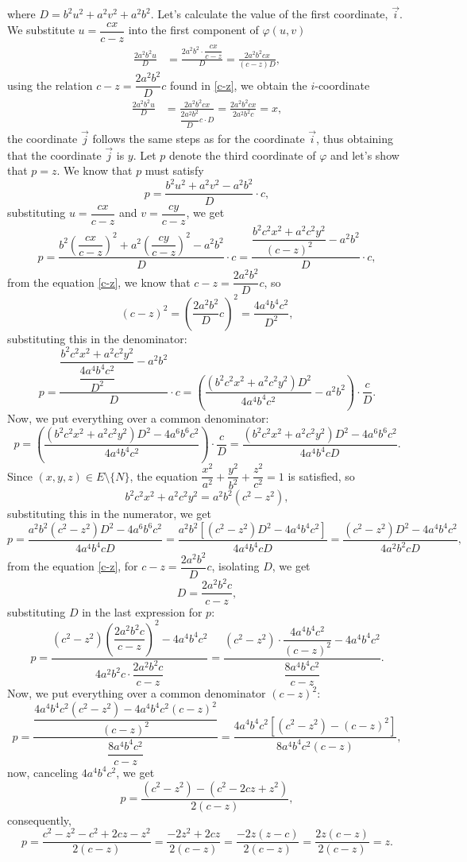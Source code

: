 \documentclass{amsart}
\theoremstyle{plain}
\numberwithin{equation}{section}
\begin{document}
where \( D = b^2u^2 + a^2v^2 + a^2b^2 \). Let's calculate the value of the first coordinate, \( \vec{i} \). We substitute \( u = \dfrac{cx}{c - z} \) into the first component of \( \varphi(u,v) \)
\begin{align*}
	\frac{2a^2b^2u}{D} &= \frac{2a^2b^2 \cdot \dfrac{cx}{c - z}}{D} = \frac{2a^2b^2cx}{(c - z)D},
\end{align*}
using the relation \( c - z = \dfrac{2a^2b^2}{D}c \) found in \eqref{c-z}, we obtain the \( i \)-coordinate
\begin{align*}
	\frac{2a^2b^2u}{D} &= \frac{2a^2b^2cx}{\dfrac{2a^2b^2}{D}c \cdot D} = \frac{2a^2b^2cx}{2a^2b^2c} = x,
\end{align*}
the coordinate \( \vec{j} \) follows the same steps as for the coordinate \( \vec{i} \), thus obtaining that the coordinate \( \vec{j} \) is \( y \). Let \( p \) denote the third coordinate of \( \varphi \) and let's show that \( p = z \). We know that \( p \) must satisfy
$$
p = \frac{b^2u^2 + a^2v^2 - a^2b^2}{D} \cdot c,
$$
substituting \( u = \dfrac{cx}{c - z} \) and \( v = \dfrac{cy}{c - z} \), we get
$$
p = \frac{b^2\left( \dfrac{cx}{c-z} \right)^2 + a^2\left( \dfrac{cy}{c-z} \right)^2 - a^2b^2 }{D} \cdot c
= \frac{ \dfrac{b^2c^2x^2 + a^2c^2y^2}{(c-z)^2} - a^2b^2 }{D} \cdot c,
$$
from the equation \eqref{c-z}, we know that \( c - z = \dfrac{2a^2b^2}{D}c \), so
$$
(c - z)^2 = \left( \dfrac{2a^2b^2}{D}c \right)^2 = \dfrac{4a^4b^4c^2}{D^2},
$$
substituting this in the denominator:
$$
p = \frac{ \dfrac{b^2c^2x^2 + a^2c^2y^2}{\dfrac{4a^4b^4c^2}{D^2}} - a^2b^2 }{D} \cdot c
=\left( \dfrac{(b^2c^2x^2 + a^2c^2y^2)D^2}{4a^4b^4c^2} - a^2b^2 \right) \cdot \dfrac{c}{D}.
$$
Now, we put everything over a common denominator:
$$
p = \left( \dfrac{(b^2c^2x^2 + a^2c^2y^2)D^2 - 4a^6b^6c^2}{4a^4b^4c^2} \right) \cdot \dfrac{c}{D}
= \dfrac{(b^2c^2x^2 + a^2c^2y^2)D^2 - 4a^6b^6c^2}{4a^4b^4c D}.
$$
Since \( (x,y,z) \in E \setminus \{N\} \), the equation \( \dfrac{x^2}{a^2} + \dfrac{y^2}{b^2} + \dfrac{z^2}{c^2} = 1 \) is satisfied, so
$$
b^2c^2x^2 + a^2c^2y^2 = a^2b^2(c^2 - z^2),
$$
substituting this in the numerator, we get
$$
p = \dfrac{a^2b^2(c^2 - z^2)D^2 - 4a^6b^6c^2}{4a^4b^4c D}
= \dfrac{a^2b^2 \left[ (c^2 - z^2)D^2 - 4a^4b^4c^2 \right]}{4a^4b^4c D}= \dfrac{(c^2 - z^2)D^2 - 4a^4b^4c^2}{4a^2b^2c D},
$$
from the equation \eqref{c-z}, for \( c - z = \dfrac{2a^2b^2}{D}c \), isolating \( D \), we get
$$
D = \dfrac{2a^2b^2c}{c - z},
$$
substituting \( D \) in the last expression for \( p \):
$$
p = \dfrac{(c^2 - z^2)\left( \dfrac{2a^2b^2c}{c - z} \right)^2 - 4a^4b^4c^2}{4a^2b^2c \cdot \dfrac{2a^2b^2c}{c - z}}
= \dfrac{(c^2 - z^2) \cdot \dfrac{4a^4b^4c^2}{(c - z)^2} - 4a^4b^4c^2}{\dfrac{8a^4b^4c^2}{c - z}}.
$$
Now, we put everything over a common denominator \( (c - z)^2 \):
$$
p = \dfrac{ \dfrac{4a^4b^4c^2(c^2 - z^2) - 4a^4b^4c^2(c - z)^2}{(c - z)^2} }{ \dfrac{8a^4b^4c^2}{c - z}}
= \dfrac{4a^4b^4c^2 \left[ (c^2 - z^2) - (c - z)^2 \right]}{8a^4b^4c^2 (c - z)},
$$
now, canceling \( 4a^4b^4c^2 \), we get
$$
p = \dfrac{(c^2 - z^2) - (c^2 - 2cz + z^2)}{2(c - z)},
$$
consequently,
$$
p = \dfrac{c^2 - z^2 - c^2 + 2cz - z^2}{2(c - z)} = \dfrac{-2z^2 + 2cz}{2(c - z)} = \dfrac{-2z(z - c)}{2(c - z)} = \dfrac{2z(c - z)}{2(c - z)} = z.
$$
\end{document}
